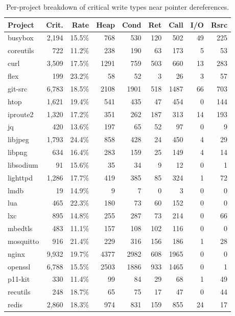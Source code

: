 \begin{table}[t]
\centering
\caption{Per-project breakdown of critical write types near pointer dereferences.}
\label{tab:critical-breakdown}
\small
\begin{tabular}{lrrrrrrrr}
\toprule
\textbf{Project} & \textbf{Crit.} & \textbf{Rate} & \textbf{Heap} & \textbf{Cond} & \textbf{Ret} & \textbf{Call} & \textbf{I/O} & \textbf{Rsrc} \\
\midrule
  busybox & 2,194 & 15.5\% & 768 & 530 & 120 & 502 & 49 & 225 \\
  coreutils & 722 & 11.2\% & 238 & 190 & 63 & 173 & 5 & 53 \\
  curl & 3,509 & 17.5\% & 1291 & 759 & 503 & 660 & 13 & 283 \\
  flex & 199 & 23.2\% & 58 & 52 & 3 & 26 & 3 & 57 \\
  git-src & 6,783 & 18.5\% & 2108 & 1901 & 518 & 1487 & 66 & 703 \\
  htop & 1,621 & 19.4\% & 541 & 435 & 47 & 454 & 0 & 144 \\
  iproute2 & 1,320 & 17.2\% & 351 & 262 & 187 & 313 & 14 & 193 \\
  jq & 420 & 13.6\% & 197 & 65 & 52 & 97 & 0 & 9 \\
  libjpeg & 1,793 & 24.4\% & 858 & 428 & 24 & 450 & 4 & 29 \\
  libpng & 634 & 16.4\% & 283 & 159 & 25 & 149 & 4 & 14 \\
  libsodium & 91 & 15.6\% & 35 & 34 & 9 & 12 & 0 & 1 \\
  lighttpd & 1,286 & 17.7\% & 419 & 385 & 85 & 324 & 1 & 72 \\
  lmdb & 19 & 14.9\% & 9 & 7 & 0 & 3 & 0 & 0 \\
  lua & 465 & 22.3\% & 180 & 73 & 60 & 152 & 0 & 0 \\
  lxc & 895 & 14.8\% & 255 & 287 & 73 & 214 & 0 & 66 \\
  mbedtls & 483 & 11.1\% & 157 & 108 & 102 & 116 & 0 & 0 \\
  mosquitto & 916 & 21.4\% & 229 & 316 & 156 & 186 & 1 & 28 \\
  nginx & 9,932 & 19.7\% & 4377 & 2982 & 608 & 1965 & 0 & 0 \\
  openssl & 6,788 & 15.5\% & 2503 & 1886 & 933 & 1465 & 0 & 1 \\
  p11-kit & 330 & 11.4\% & 99 & 84 & 29 & 68 & 1 & 49 \\
  recutils & 248 & 18.7\% & 65 & 75 & 17 & 47 & 0 & 44 \\
  redis & 2,860 & 18.3\% & 974 & 831 & 159 & 855 & 24 & 17 \\

\end{tabular}
\end{table}
